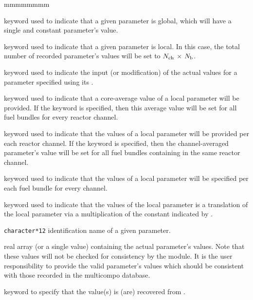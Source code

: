 \begin{ListeDeDescription}{mmmmmmmm}
\item[\moc{GLOBAL}] keyword used to indicate that a given parameter is global,
which will have a single and constant parameter's value.

\item[\moc{LOCAL}] keyword used to indicate that a given parameter
is local. In this case, the total number of recorded parameter's values will
be set to $N_{\rm ch}$ $\times$ $N_{\rm b}$.

\item[\moc{SET-PARAM}] keyword used to indicate the input (or modification)
of the actual values for a parameter specified using its .

\item[\moc{SAME}] keyword used to indicate that a core-average
value of a local parameter will be provided. If the keyword 
is specified, then this average value will be set for all fuel bundles for
every reactor channel.

\item[\moc{CHAN}] keyword used to indicate that the values of a local
parameter will be provided per each reactor channel. If the keyword 
is specified, then the channel-averaged parameter's value will be set for all fuel
bundles containing in the same reactor channel.

\item[\moc{BUND}] keyword used to indicate that the values of a local
parameter will be specified per each fuel bundle for every channel.

\item[\moc{TIMES}] keyword used to indicate that the values of the local
parameter  is a translation of the local parameter 
via a multiplication of the constant indicated by .

\item[\dusa{PNAMEREF}] \texttt{character*12} identification name of a given
parameter.

\item[\dusa{pvalue}] real array (or a single value) containing the actual
parameter's values. Note that these values will not be checked for consistency
by the module. It is the user responsibility to provide the valid parameter's values
which should be consistent with those recorded in the multicompo database.

\item[\moc{OLDMAP}] keyword to specify that the  value(s) is (are) recovered from .


\end{ListeDeDescription}
